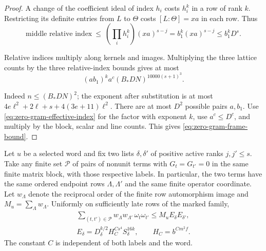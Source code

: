\begin{proof}
A change of the coefficient ideal of index \(h_i\) costs \(h_i^k\)
in a row of rank \(k\). Restricting its definite entries from
\(L\) to \(\Theta\) costs \([L:\Theta]=xa\) in each row. Thus
\[
  \text{middle relative index}\ \le\ \left(\prod_i h_i^k\right)(xa)^{s-j}
          = b_1^k(xa)^{s-j}\le b_1^k D^s .
\]

Relative indices multiply along kernels and images. Multiplying
the three lattice counts by the three relative-index bounds gives
at most
\[
 (a b_1)^k a^c(B_*DN)^{10000(s+1)^3}.
\]

Indeed \(n\le(B_*DN)^2\); the exponent after substitution is at
most \(4e\ell^2+2\ell+s+4(3e+11)\ell^2\).
There are at most \(D^2\) possible pairs \(a,b_1\).
Use \eqref{eq:zero-gram-effective-index} for the factor with
exponent \(k\), use \(a^c\le D^c\), and multiply by the block,
scalar and line counts. This gives \eqref{eq:zero-gram-frame-bound}.
\end{proof}

\begin{auxlemma}
\label{lem:zero-gram-label-pairs}
Let \(u\) be a selected word and fix two lists \(\delta,\delta'\)
of positive active ranks \(j,j'\le s\). Take any finite set
\(\mathcal P\) of pairs of nonunit terms with \(G_t=G_{t'}=0\)
in the same finite matrix block, with those respective labels.
In particular, the two terms have the same ordered endpoint rows
\(\Lambda,\Lambda'\) and the same finite operator coordinate.
Let \(w_\Lambda\) denote the reciprocal order of the finite
row automorphism image and \(M_u=\sum_\Lambda w_\Lambda\).
Uniformly on sufficiently late rows of the marked family,
\begin{equation}\label{eq:zero-gram-weight-sum}
 \begin{gathered}
 \sum_{(t,t')\in\mathcal P}
 w_{\Lambda}w_{\Lambda'}\,\omega_t\omega_{t'}
     \le M_u E_\delta E_{\delta'},\\
 E_\delta=D_\delta^{k/2}H_C^{Cs^4}S_\delta^{16k},
       \qquad H_C=b^{Cm^2f}.
 \end{gathered}
\end{equation}
The constant \(C\) is independent of both labels and the word.
\end{auxlemma}

